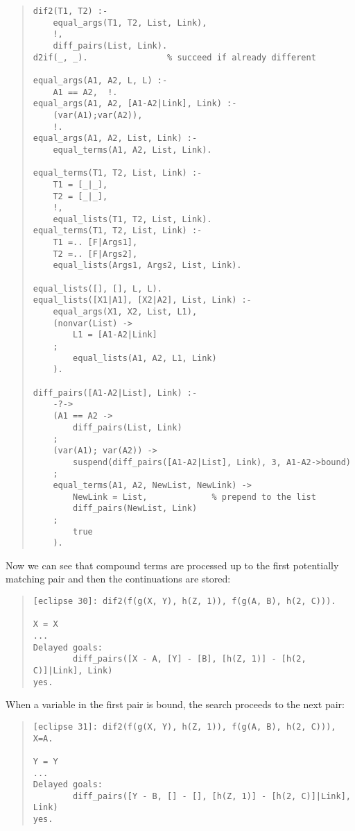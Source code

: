 \begin{quote}
\begin{verbatim}
dif2(T1, T2) :-
    equal_args(T1, T2, List, Link),
    !,
    diff_pairs(List, Link).
d2if(_, _).                % succeed if already different

equal_args(A1, A2, L, L) :-
    A1 == A2,  !.
equal_args(A1, A2, [A1-A2|Link], Link) :-
    (var(A1);var(A2)),
    !.
equal_args(A1, A2, List, Link) :-
    equal_terms(A1, A2, List, Link).

equal_terms(T1, T2, List, Link) :-
    T1 = [_|_],
    T2 = [_|_],
    !,
    equal_lists(T1, T2, List, Link).
equal_terms(T1, T2, List, Link) :-
    T1 =.. [F|Args1],
    T2 =.. [F|Args2],
    equal_lists(Args1, Args2, List, Link).

equal_lists([], [], L, L).
equal_lists([X1|A1], [X2|A2], List, Link) :-
    equal_args(X1, X2, List, L1),
    (nonvar(List) ->
        L1 = [A1-A2|Link]
    ;
        equal_lists(A1, A2, L1, Link)
    ).

diff_pairs([A1-A2|List], Link) :-
    -?->
    (A1 == A2 ->
        diff_pairs(List, Link)
    ;
    (var(A1); var(A2)) ->
        suspend(diff_pairs([A1-A2|List], Link), 3, A1-A2->bound)
    ;
    equal_terms(A1, A2, NewList, NewLink) ->
        NewLink = List,             % prepend to the list
        diff_pairs(NewList, Link)
    ;
        true
    ).
\end{verbatim}
\end{quote}


Now we can see that compound terms are processed up to the first
potentially matching pair and then the continuations
are stored:

\begin{quote}
\begin{verbatim}
[eclipse 30]: dif2(f(g(X, Y), h(Z, 1)), f(g(A, B), h(2, C))).

X = X
...
Delayed goals:
        diff_pairs([X - A, [Y] - [B], [h(Z, 1)] - [h(2, C)]|Link], Link)
yes.
\end{verbatim}
\end{quote}

When a variable in the first pair is bound, the search proceeds
to the next pair:
\begin{quote}
\begin{verbatim}
[eclipse 31]: dif2(f(g(X, Y), h(Z, 1)), f(g(A, B), h(2, C))), X=A.

Y = Y
...
Delayed goals:
        diff_pairs([Y - B, [] - [], [h(Z, 1)] - [h(2, C)]|Link], Link)
yes.
\end{verbatim}
\end{quote}

